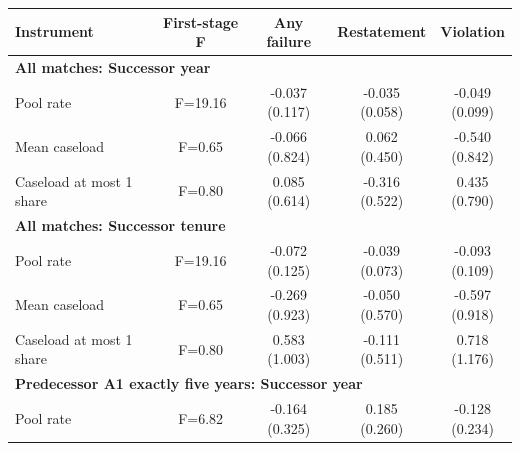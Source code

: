 \documentclass[10pt]{article}
\newcommand{\sym}[1]{\textsuperscript{#1}}
\begin{document}
\begin{minipage}{19cm}\fontsize{10}{12}\selectfont\setlength{\tabcolsep}{4pt}\renewcommand{\arraystretch}{1.12}


\def\sym#1{\ifmmode^{#1}\else\(^{#1}\)\fi}
\centering
{}
\begin{threeparttable}
\begin{tabular}{p{}cccc}
\toprule
Instrument & First-stage F & Any failure & Restatement & Violation \\
\midrule
\multicolumn{5}{l}{\textbf{All matches: Successor year}} \\
Pool rate & F=19.16 & \shortstack{-0.037\\(0.117)} & \shortstack{-0.035\\(0.058)} & \shortstack{-0.049\\(0.099)} \\
Mean caseload & F=0.65 & \shortstack{-0.066\\(0.824)} & \shortstack{0.062\\(0.450)} & \shortstack{-0.540\\(0.842)} \\
Caseload at most 1 share & F=0.80 & \shortstack{0.085\\(0.614)} & \shortstack{-0.316\\(0.522)} & \shortstack{0.435\\(0.790)} \\
\multicolumn{5}{l}{\textbf{All matches: Successor tenure}} \\
Pool rate & F=19.16 & \shortstack{-0.072\\(0.125)} & \shortstack{-0.039\\(0.073)} & \shortstack{-0.093\\(0.109)} \\
Mean caseload & F=0.65 & \shortstack{-0.269\\(0.923)} & \shortstack{-0.050\\(0.570)} & \shortstack{-0.597\\(0.918)} \\
Caseload at most 1 share & F=0.80 & \shortstack{0.583\\(1.003)} & \shortstack{-0.111\\(0.511)} & \shortstack{0.718\\(1.176)} \\
\multicolumn{5}{l}{\textbf{Predecessor A1 exactly five years: Successor year}} \\
Pool rate & F=6.82 & \shortstack{-0.164\\(0.325)} & \shortstack{0.185\\(0.260)} & \shortstack{-0.128\\(0.234)} \\

\end{tabular}
\end{threeparttable}
\end{minipage}
\end{document}
